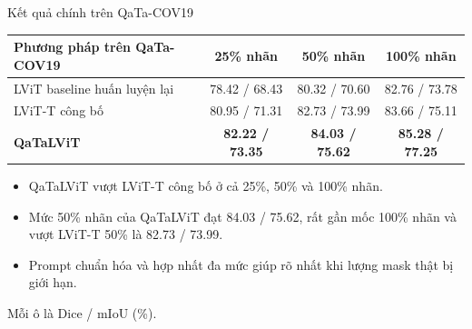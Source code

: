 \documentclass[aspectratio=169,11pt]{beamer}
\newcommand{\smallnote}[1]{%
  \par
  \vspace{0.12cm}
  {\footnotesize\color{ink}#1\par}
}
\begin{document}
\begin{frame}{Kết quả chính trên QaTa-COV19}
  \begin{center}
  \scriptsize
  \renewcommand{\arraystretch}{1.20}
  \begin{tabular}{lccc}
    \toprule
    \textbf{Phương pháp trên QaTa-COV19} & \textbf{25\% nhãn} & \textbf{50\% nhãn} & \textbf{100\% nhãn} \\
    \midrule
    LViT baseline huấn luyện lại & 78.42 / 68.43 & 80.32 / 70.60 & 82.76 / 73.78 \\
    LViT-T công bố & 80.95 / 71.31 & 82.73 / 73.99 & 83.66 / 75.11 \\
    \textbf{QaTaLViT} & \textbf{82.22 / 73.35} & \textbf{84.03 / 75.62} & \textbf{85.28 / 77.25} \\
    \bottomrule
  \end{tabular}
  \end{center}
  \vspace{0.15cm}
  \begin{itemize}
    \item QaTaLViT vượt LViT-T công bố ở cả 25\%, 50\% và 100\% nhãn.
    \item Mức 50\% nhãn của QaTaLViT đạt 84.03 / 75.62, rất gần mốc 100\% nhãn và vượt LViT-T 50\% là 82.73 / 73.99.
    \item Prompt chuẩn hóa và hợp nhất đa mức giúp rõ nhất khi lượng mask thật bị giới hạn.
  \end{itemize}
  \smallnote{Mỗi ô là Dice / mIoU (\%).}
\end{frame}
\end{document}
